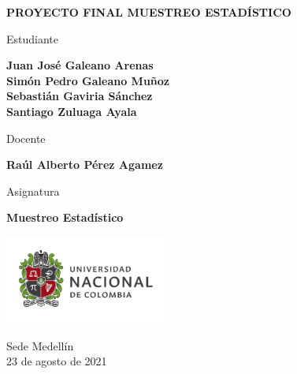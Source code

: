 \begin{titlepage}
   \Large{
   \begin{center}
       \vspace*{1cm}

       \textbf{PROYECTO FINAL MUESTREO ESTADÍSTICO}

            
       \vspace{2.5cm}
       
       Estudiante
       
       \vspace{0.5cm}
        
        
       \textbf{Juan José Galeano Arenas} \\
       \textbf{Simón Pedro Galeano Muñoz} \\
       \textbf{Sebastián Gaviria Sánchez} \\
       \textbf{Santiago Zuluaga Ayala} \\
       
              \vspace{1.5cm}
       
       Docente
       
       \vspace{0.5cm}

       \textbf{Raúl Alberto Pérez Agamez}
       
       \vspace{0.5cm}

       \vspace{1.5cm}
       
       Asignatura
       
       \vspace{0.5cm}

       \textbf{Muestreo Estadístico}

       \vfill

            
       \vspace{0.8cm}
     
       \includegraphics[width=0.4\textwidth]{logounal.png}
            
       Sede Medellín\\
       23 de agosto de 2021
       
   \end{center}
   }
\end{titlepage}